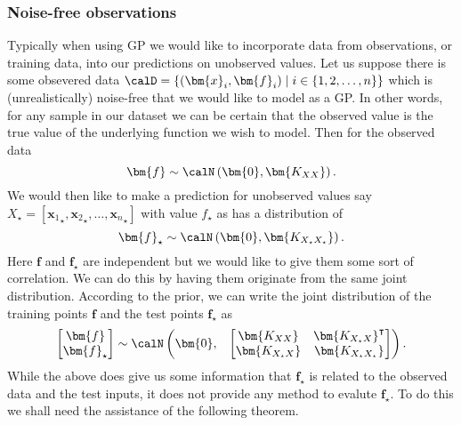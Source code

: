 \subsubsection{Noise-free observations}\label{Section1.5.1}
Typically when using GP we would like to incorporate data from observations, or training data, into our predictions on unobserved values.
Let us suppose there is some obsevered data $\calD = \left\{ (\bm{x}_i, \bm{f}_i) \mid i \in \left\{ 1,2, \ldots , n \right\} \right\}$ which is (unrealistically) noise-free that we would like to model as a GP. In other words, for any sample in our dataset we can be certain that the observed value is the true value of the underlying function we wish to model. Then for the observed data
\[
    \bm{f} \sim \calN \left( \bm{0}, \bm{K_{XX}} \right).
\]
We would then like to make a prediction for unobserved values say $X_{\star} = \left[ {\bm{x}_1}_{\star}, {\bm{x}_2}_{\star}, \ldots , {\bm{x}_{n}}_{\star} \right]$ with value $f_{\star}$ as has a distribution of
\[
    \bm{f}_{\star} \sim \calN \left( \bm{0}, \bm{K_{X_{\star}X_{\star}}} \right).
\]
Here $\bm{f}$ and $\bm{f}_{\star}$ are independent but we would like to give them some sort of correlation. We can do this by having them originate from the same joint distribution. According to the prior, we can write the joint distribution of the training points $\bm{f}$ and the test points $\bm{f}_{\star}$ as
\[
    \begin{bmatrix}
        \bm{f} \\
        \bm{f}_{\star}
    \end{bmatrix}
    \sim \calN
    \begin{pmatrix}
        \bm{0}, &
        {
                \begin{bmatrix}
                    \bm{K_{XX}}         & \bm{K_{X_{\star}X}}^{\intercal} \\
                    \bm{K_{X_{\star}X}} & \bm{K_{X_{\star}X_{\star}}}
                \end{bmatrix}
            }
    \end{pmatrix}.
\]
While the above does give us some information that $\bm{f}_{\star}$ is related to the observed data and the test inputs, it does not provide any method to evalute $\bm{f}_{\star}$. To do this we shall need the assistance of the following theorem.
